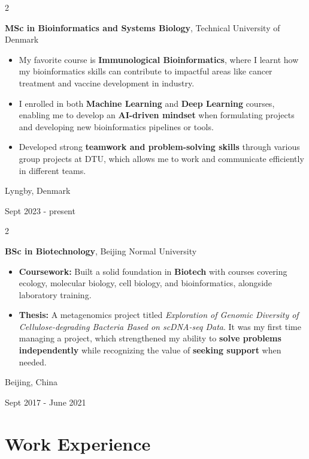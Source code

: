 \documentclass[10pt, letterpaper]{article}
\newenvironment{highlights}{
    \begin{itemize}[
        topsep=0.10 cm,
        parsep=0.10 cm,
        partopsep=0pt,
        itemsep=0pt,
        leftmargin=0.4 cm + 10pt
    ]
}{
    \end{itemize}
} %
\newenvironment{twocolentry}[2][]{
    \onecolentry
    \def\secondColumn{#2}
    \setcolumnwidth{\fill, 4.5 cm}
    \begin{paracol}{2}
}{
    \switchcolumn \raggedleft \secondColumn
    \end{paracol}
    \endonecolentry
} %
\begin{document}
        
        \begin{twocolentry}{
    Lyngby, Denmark

    Sept 2023 - present
}
    \textbf{MSc in Bioinformatics and Systems Biology}, Technical University of Denmark
    \begin{highlights}
        \item My favorite course is \textbf{Immunological Bioinformatics}, where I learnt how my bioinformatics skills can contribute to impactful areas like cancer treatment and vaccine development in industry.
        \item I enrolled in both \textbf{Machine Learning} and \textbf{Deep Learning} courses, enabling me to develop an \textbf{AI-driven mindset} when formulating projects and developing new bioinformatics pipelines or tools. 
        \item Developed strong \textbf{ teamwork and problem-solving skills} through various group projects at DTU, which allows me to work and communicate efficiently in different teams. 
    \end{highlights}
\end{twocolentry}


        \vspace{0.3 cm}

\begin{twocolentry}{
    Beijing, China
    
    Sept 2017 - June 2021
}
    \textbf{BSc in Biotechnology}, Beijing Normal University
    \begin{highlights}
        \item \textbf{Coursework:} Built a solid foundation in \textbf{Biotech} with courses covering ecology, molecular biology, cell biology, and bioinformatics, alongside laboratory training.
        \item \textbf{Thesis:} A metagenomics project titled \textit{Exploration of Genomic Diversity of Cellulose-degrading Bacteria Based on scDNA-seq Data}. It was my first time managing a project, which strengthened my ability to \textbf{solve problems independently} while recognizing the value of \textbf{seeking support} when needed. 
    \end{highlights}
\end{twocolentry}


    
    \section{Work Experience}
\end{document}
